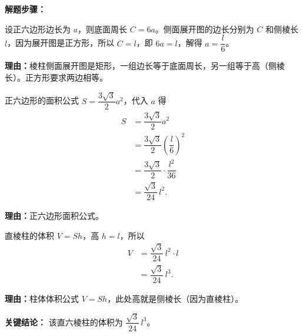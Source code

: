 \begin{examplebox}
	\textbf{\textcolor{CExample}{解题步骤：}}
	\begin{description}[style=nextline, leftmargin=2.8em, labelsep=0.5em, itemsep=0.45em]
		\item[\textbf{第一步（建立边长关系）：}] 设正六边形边长为 $a$，则底面周长 $C=6a$。侧面展开图的边长分别为 $C$ 和侧棱长 $l$，因为展开图是正方形，所以 $C=l$，即 $6a=l$，解得 $a=\dfrac{l}{6}$。
			\par\textbf{理由：}棱柱侧面展开图是矩形，一组边长等于底面周长，另一组等于高（侧棱长）。正方形要求两边相等。
		\item[\textbf{第二步（计算底面积）：}] 正六边形的面积公式 $S = \dfrac{3\sqrt{3}}{2}a^2$，代入 $a$ 得
			\[
				\begin{aligned}
					S &= \dfrac{3\sqrt{3}}{2}a^2 \\
					&= \dfrac{3\sqrt{3}}{2}\left(\dfrac{l}{6}\right)^2 \\
					&= \dfrac{3\sqrt{3}}{2} \cdot \dfrac{l^2}{36} \\
					&= \dfrac{\sqrt{3}}{24}\,l^2.
			\end{aligned}
			\]
			\par\textbf{理由：}正六边形面积公式。
		\item[\textbf{第三步（求体积）：}] 直棱柱的体积 $V = S h$，高 $h=l$，所以
			\[
				\begin{aligned}
					V &= \dfrac{\sqrt{3}}{24}\,l^2 \cdot l \\
					&= \dfrac{\sqrt{3}}{24}\,l^3.
			\end{aligned}
			\]
			\par\textbf{理由：}柱体体积公式 $V=Sh$，此处高就是侧棱长（因为直棱柱）。
	\end{description}

	\textbf{\textcolor{CExample}{关键结论：}}
	该直六棱柱的体积为 $\dfrac{\sqrt{3}}{24}\,l^3$。
\end{examplebox}
